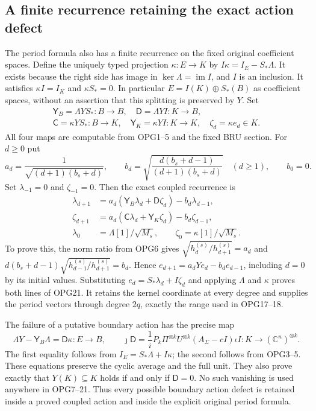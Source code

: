 \documentclass[11pt,a4paper]{article}
\begin{document}
\subsection{A finite recurrence retaining the exact action defect}
The period formula also has a finite recurrence on the fixed
original coefficient spaces. Define the uniquely typed projection
$\kappa:E\to K$ by
$I\kappa=I_E-S_*\Lambda$. It exists because the right side has
image in $\ker\Lambda=\operatorname{im}I$, and $I$ is an
inclusion. It satisfies $\kappa I=I_K$ and $\kappa S_*=0$.
In particular $E=I(K)\oplus S_*(B)$ as coefficient spaces, without
an assertion that this splitting is preserved by $Y$.
Set
\[
\begin{gathered}
 \mathsf Y_B=\Lambda YS_*:B\to B,\quad
 \mathsf D=\Lambda YI:K\to B,\\
 \mathsf C=\kappa YS_*:B\to K,\quad
 \mathsf Y_K=\kappa YI:K\to K,\quad
 \zeta_d=\kappa e_d\in K.
\end{gathered}\tag{OPG19}
\]
All four maps are computable from OPG1--5 and the fixed BRU
section. For $d\geq0$ put
\[
 a_d=\frac1{\sqrt{(d+1)(b_s+d)}},\qquad
 b_d=\sqrt{\frac{d(b_s+d-1)}{(d+1)(b_s+d)}}\quad(d\geq1),
 \qquad b_0=0.
 \tag{OPG20}
\]
Set $\lambda_{-1}=0$ and $\zeta_{-1}=0$. Then the exact coupled
recurrence is
\[
\boxed{\begin{aligned}
 \lambda_{d+1}&=a_d(\mathsf Y_B\lambda_d+\mathsf D\zeta_d)
                                          -b_d\lambda_{d-1},\\
 \zeta_{d+1}&=a_d(\mathsf C\lambda_d+\mathsf Y_K\zeta_d)
                                          -b_d\zeta_{d-1},\\
 \lambda_0&=\Lambda[1]/\sqrt{M_s},\qquad
 \zeta_0=\kappa[1]/\sqrt{M_s}.
\end{aligned}}\tag{OPG21}
\]
To prove this, the norm ratio from OPG6 gives
$\sqrt{h_d^{(s)}/h_{d+1}^{(s)}}=a_d$ and
$d(b_s+d-1)\sqrt{h_{d-1}^{(s)}/h_{d+1}^{(s)}}=b_d$.
Hence $e_{d+1}=a_dYe_d-b_de_{d-1}$, including $d=0$ by its
initial values. Substituting $e_d=S_*\lambda_d+I\zeta_d$ and
applying $\Lambda$ and $\kappa$ proves both lines of OPG21.
It retains the kernel coordinate at every degree and supplies
the period vectors through degree $2q$, exactly the range used
in OPG17--18.

The failure of a putative boundary action has the precise map
\[
 \Lambda Y-\mathsf Y_B\Lambda=\mathsf D\kappa:E\to B,\qquad
 \jmath\mathsf D=
 \frac1iP_k\Pi^{\otimes k}U^{\otimes k}
                   (A_\Sigma-cI)\iota I:K\to(\mathbb C^n)^{\otimes k}.
 \tag{OPG22}
\]
The first equality follows from $I_E=S_*\Lambda+I\kappa$;
the second follows from OPG3--5. These equations preserve the
cyclic average and the full unit. They also prove exactly that
$Y(K)\subseteq K$ holds if and only if $\mathsf D=0$.
No such vanishing is used anywhere in OPG7--21. Thus every
possible boundary action defect is retained inside a proved
coupled action and inside the explicit original period formula.
\end{document}
